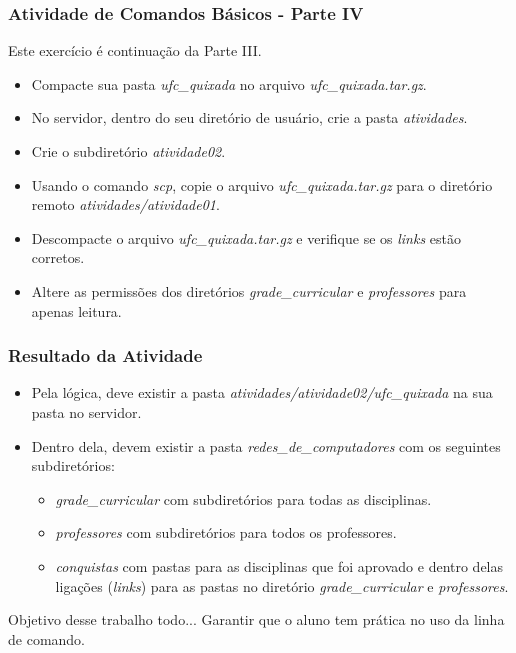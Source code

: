 \documentclass{beamer}
\begin{document}
   \begin{frame}
      \frametitle{Atividade de Comandos Básicos - Parte IV}
      Este exercício é continuação da Parte III.
      \begin{itemize}
         \item Compacte sua pasta \textit{ufc\_quixada} no arquivo \textit{ufc\_quixada.tar.gz}.
	 \item No servidor, dentro do seu diretório de usuário, crie a pasta \textit{atividades}.
	 \item Crie o subdiretório \textit{atividade02}.
         \item Usando o comando \textit{scp}, copie o arquivo \textit{ufc\_quixada.tar.gz} para o diretório remoto \textit{atividades/atividade01}. 
         \item Descompacte o arquivo \textit{ufc\_quixada.tar.gz} e verifique se os \textit{links} estão corretos.
         \item Altere as permissões dos diretórios \textit{grade\_curricular} e \textit{professores} para apenas leitura.
      \end{itemize}
   \end{frame}

\begin{frame}
   \frametitle{Resultado da Atividade}
   \begin{itemize}
      \item Pela lógica, deve existir a pasta \textit{atividades/atividade02/ufc\_quixada} na sua pasta no servidor.
      \item Dentro dela, devem existir a pasta \textit{redes\_de\_computadores} com os seguintes subdiretórios:
      \begin{itemize}
         \item \textit{grade\_curricular} com subdiretórios para todas as disciplinas.
	 \item \textit{professores} com subdiretórios para todos os professores.
	 \item \textit{conquistas} com pastas para as disciplinas que foi aprovado e dentro delas ligações (\textit{links}) para as pastas no diretório \textit{grade\_curricular} e \textit{professores}.  
      \end{itemize}
   \end{itemize}
   \begin{block}{Objetivo desse trabalho todo...}
   Garantir que o aluno tem prática no uso da linha de comando.
   \end{block}
\end{frame}
\end{document}
